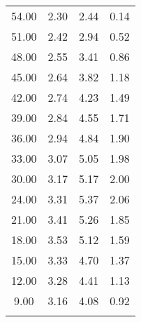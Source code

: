 \begin{table}
\begin{tabular}[t]{cccc}
    54.00 & 2.30 & 2.44 & 0.14 \\
    51.00 & 2.42 & 2.94 & 0.52 \\
    48.00 & 2.55 & 3.41 & 0.86 \\
    45.00 & 2.64 & 3.82 & 1.18 \\
    42.00 & 2.74 & 4.23 & 1.49 \\
    39.00 & 2.84 & 4.55 & 1.71 \\
    36.00 & 2.94 & 4.84 & 1.90 \\
    33.00 & 3.07 & 5.05 & 1.98 \\
    30.00 & 3.17 & 5.17 & 2.00 \\
    24.00 & 3.31 & 5.37 & 2.06 \\
    21.00 & 3.41 & 5.26 & 1.85 \\
    18.00 & 3.53 & 5.12 & 1.59 \\
    15.00 & 3.33 & 4.70 & 1.37 \\
    12.00 & 3.28 & 4.41 & 1.13 \\
    9.00 & 3.16 & 4.08 & 0.92 \\

    \bottomrule
    
    \label{tab:beid_rund}
\end{tabular}
\label{tab:beidseitig}
\end{table}
